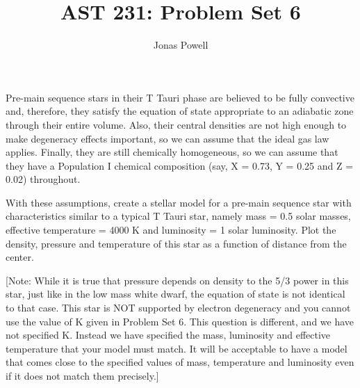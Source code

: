 \documentclass[12pt]{article}
\newenvironment{problem}[2][Problem]{\begin{trivlist}
\item[\hskip \labelsep {\bfseries #1}\hskip \labelsep {\bfseries #2.}]}{\end{trivlist}}
\newenvironment{answer}[2][Answer]{\begin{trivlist}
\item[\hskip \labelsep {\bfseries #1}\hskip \labelsep {\bfseries #2.}]}{\end{trivlist}}
\begin{document}

\title{AST 231: Problem Set 6}
\author{Jonas Powell}
\maketitle

\begin{problem}{1}
Pre-main sequence stars in their T Tauri phase are believed to be fully convective and, therefore, they satisfy the equation of state
appropriate to an adiabatic zone through their entire volume. Also, their central densities are not high enough to make degeneracy effects important, so we can assume that the ideal gas law applies. Finally, they are still chemically homogeneous, so we can assume that they have a Population I chemical composition (say, X = 0.73, Y = 0.25 and Z = 0.02) throughout.


\bigskip
\bigskip

With these assumptions, create a stellar model for a pre-main sequence star with characteristics similar to a typical T Tauri star, namely mass = 0.5 solar masses, effective temperature = 4000 K and luminosity = 1 solar luminosity. Plot the density, pressure and temperature of this star as a function of distance from the center.

\bigskip
\bigskip

[Note: While it is true that pressure depends on density to the 5/3 power in this star, just like in the low mass white dwarf, the equation of state is not identical to that case. This star is NOT supported by electron degeneracy and you cannot use the value of K given in Problem Set 6. This question is different, and we have not specified K. Instead we have specified the mass, luminosity and effective temperature that your model must match. It will be acceptable to have a model that comes close to the specified values of mass, temperature and luminosity even if it does not match them precisely.]
\end{problem}






\begin{answer}{1}


\end{answer}
\end{document}
